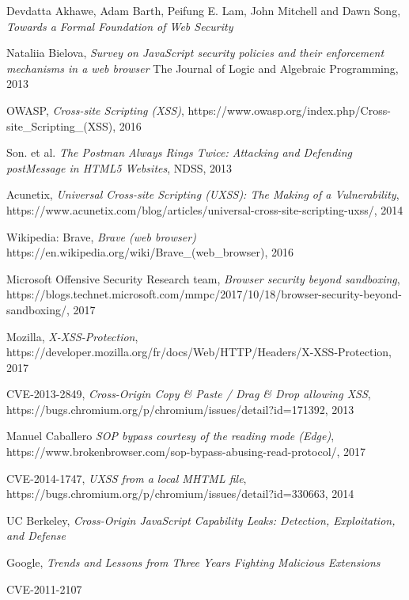 \documentclass[journal]{IEEEtran}
\begin{document}
\begin{thebibliography}{1}
Devdatta Akhawe, Adam Barth, Peifung E. Lam, John Mitchell and Dawn Song,
\textit{Towards a Formal Foundation of Web Security}
 
Nataliia Bielova,
\textit{Survey on JavaScript security policies and their enforcement mechanisms in a web browser}
The Journal of Logic and Algebraic Programming, 2013

OWASP,
\textit{Cross-site Scripting (XSS)},
https://www.owasp.org/index.php/Cross-site\_Scripting\_(XSS),
2016

Son. et al. 
\textit{The Postman Always Rings Twice: Attacking and Defending postMessage in HTML5 Websites}, 
NDSS, 2013

Acunetix,
\textit{Universal Cross-site Scripting (UXSS): The Making of a Vulnerability},
https://www.acunetix.com/blog/articles/universal-cross-site-scripting-uxss/,
2014

Wikipedia: Brave,
\textit{Brave (web browser)}
https://en.wikipedia.org/wiki/Brave\_(web\_browser),
2016

Microsoft Offensive Security Research team,
\textit{Browser security beyond sandboxing},
https://blogs.technet.microsoft.com/mmpc/2017/10/18/browser-security-beyond-sandboxing/,
2017

Mozilla,
\textit{X-XSS-Protection},
https://developer.mozilla.org/fr/docs/Web/HTTP/Headers/X-XSS-Protection,
2017

CVE-2013-2849,
\textit{Cross-Origin Copy \& Paste / Drag \& Drop allowing XSS},
https://bugs.chromium.org/p/chromium/issues/detail?id=171392,
2013

Manuel Caballero
\textit{SOP bypass courtesy of the reading mode (Edge)},
https://www.brokenbrowser.com/sop-bypass-abusing-read-protocol/,
2017

CVE-2014-1747,
\textit{UXSS from a local MHTML file},
https://bugs.chromium.org/p/chromium/issues/detail?id=330663,
2014

UC Berkeley,
\textit{Cross-Origin JavaScript Capability Leaks: Detection, Exploitation, and Defense}


Google,
\textit{Trends and Lessons from Three Years Fighting Malicious Extensions}

CVE-2011-2107


\end{thebibliography}
\end{document}
